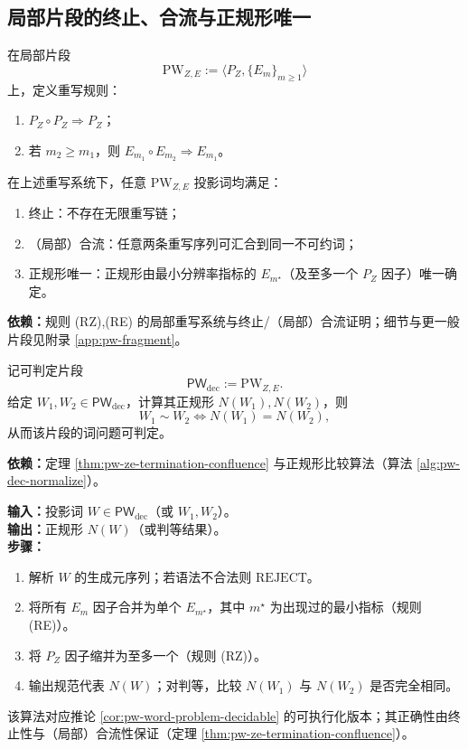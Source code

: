 \subsection{局部片段的终止、合流与正规形唯一}
在局部片段
$$
\mathrm{PW}_{Z,E}:=\langle P_Z,\{E_m\}_{m\ge 1}\rangle
$$
上，定义重写规则：
\begin{enumerate}
  \item[(RZ)] $P_Z\circ P_Z\Rightarrow P_Z$；
  \item[(RE)] 若 $m_2\ge m_1$，则 $E_{m_1}\circ E_{m_2}\Rightarrow E_{m_1}$。
\end{enumerate}

\begin{theorem}[读出塔重写的终止性与合流性]\label{thm:pw-ze-termination-confluence}
在上述重写系统下，任意 $\mathrm{PW}_{Z,E}$ 投影词均满足：
\begin{enumerate}
  \item 终止：不存在无限重写链；
  \item（局部）合流：任意两条重写序列可汇合到同一不可约词；
  \item 正规形唯一：正规形由最小分辨率指标的 $E_{m^\star}$（及至多一个 $P_Z$ 因子）唯一确定。
\end{enumerate}
\par\noindent\textnormal{\textbf{依赖：}规则 (RZ),(RE) 的局部重写系统与终止/（局部）合流证明；细节与更一般片段见附录 \ref{app:pw-fragment}。}
\end{theorem}

\begin{corollary}[判等可判定]\label{cor:pw-word-problem-decidable}
记可判定片段
$$
\mathsf{PW}_{\mathrm{dec}}:=\mathrm{PW}_{Z,E}.
$$
给定 $W_1,W_2\in \mathsf{PW}_{\mathrm{dec}}$，计算其正规形 $N(W_1),N(W_2)$，则
$$
W_1\sim W_2 \iff N(W_1)=N(W_2),
$$
从而该片段的词问题可判定。
\par\noindent\textnormal{\textbf{依赖：}定理 \ref{thm:pw-ze-termination-confluence} 与正规形比较算法（算法 \ref{alg:pw-dec-normalize}）。}
\end{corollary}

\begin{algorithm}\label{alg:pw-dec-normalize}
\textbf{输入：}投影词 $W\in\mathsf{PW}_{\mathrm{dec}}$（或 $W_1,W_2$）。\\
\textbf{输出：}正规形 $N(W)$（或判等结果）。\\
\textbf{步骤：}
\begin{enumerate}
  \item 解析 $W$ 的生成元序列；若语法不合法则 $\mathrm{REJECT}$。
  \item 将所有 $E_m$ 因子合并为单个 $E_{m^\star}$，其中 $m^\star$ 为出现过的最小指标（规则 (RE)）。
  \item 将 $P_Z$ 因子缩并为至多一个（规则 (RZ)）。
  \item 输出规范代表 $N(W)$；对判等，比较 $N(W_1)$ 与 $N(W_2)$ 是否完全相同。
\end{enumerate}
该算法对应推论 \ref{cor:pw-word-problem-decidable} 的可执行化版本；其正确性由终止性与（局部）合流性保证（定理 \ref{thm:pw-ze-termination-confluence}）。
\end{algorithm}

